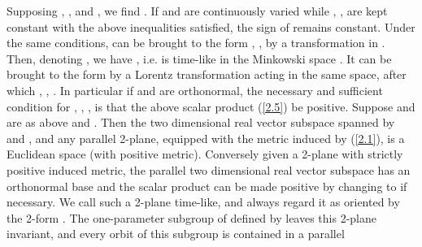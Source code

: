 \documentclass[a4paper,a4paper]{article}
\begin{document}
Supposing \coordHE{}, \coordHE{}, and \coordHE{}, we find
\coordHE{}.
If \coordHE{} and \coordHE{} are continuously varied while \coordHE{},
\coordHE{}, \coordHE{} are kept constant with the above inequalities
satisfied, the sign of \coordHE{}
remains constant. Under the same conditions, \coordHE{} can be brought to
the form \coordHE{}, \coordHE{}, by a transformation in \coordHE{}.
Then, denoting \coordHE{},
we have \coordHE{}, i.e. \coordHE{} is time-like in the Minkowski
space \coordHE{}. It can be brought to the form \coordHE{} by a
Lorentz transformation acting in the same space, after which
\coordHE{}, \coordHE{}, \coordHE{}.
In particular if \coordHE{} and \coordHE{} are orthonormal,
the necessary and sufficient condition
for \coordHE{}, \coordHE{},
\coordHE{}, is that the above
scalar product (\ref{2.5}) be positive.
Suppose \coordHE{} and \coordHE{} are as above and \coordHE{}. Then the two dimensional real vector subspace spanned by
\coordHE{} and \coordHE{}, and any parallel 2-plane, equipped with the metric induced by
(\ref{2.1}), is a Euclidean space (with positive metric). Conversely given a
2-plane with strictly positive induced metric, the parallel two dimensional
real vector subspace has an orthonormal base \coordHE{} and the scalar product
\coordHE{} can be made positive by changing \coordHE{} to
\coordHE{} if necessary. We call such a 2-plane time-like, and always regard it as
oriented by the 2-form \coordHE{}. The one-parameter subgroup of
\coordHE{} defined by \coordHE{} leaves this 2-plane
invariant, and every orbit of this subgroup is contained in a parallel
\end{document}
